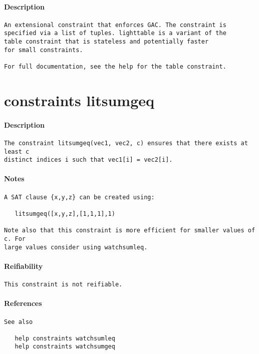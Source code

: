 \paragraph{Description}
{\footnotesize
\begin{verbatim}
An extensional constraint that enforces GAC. The constraint is
specified via a list of tuples. lighttable is a variant of the 
table constraint that is stateless and potentially faster
for small constraints.

For full documentation, see the help for the table constraint.
\end{verbatim}
}
\section{constraints litsumgeq}
\paragraph{Description}
{\footnotesize
\begin{verbatim}
The constraint litsumgeq(vec1, vec2, c) ensures that there exists at least c
distinct indices i such that vec1[i] = vec2[i].
\end{verbatim}
}
\paragraph{Notes}
{\footnotesize
\begin{verbatim}
A SAT clause {x,y,z} can be created using:

   litsumgeq([x,y,z],[1,1,1],1)

Note also that this constraint is more efficient for smaller values of c. For
large values consider using watchsumleq.
\end{verbatim}
}
\paragraph{Reifiability}
{\footnotesize
\begin{verbatim}
This constraint is not reifiable.
\end{verbatim}
}
\paragraph{References}
{\footnotesize
\begin{verbatim}
See also

   help constraints watchsumleq
   help constraints watchsumgeq
\end{verbatim}
}
